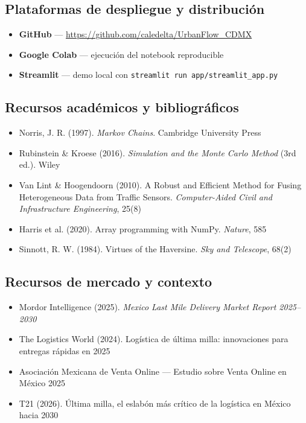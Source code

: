 \documentclass[11pt,a4paper]{article}
\begin{document}
\subsection{Plataformas de despliegue y distribución}
\begin{itemize}
  \item \textbf{GitHub} --- \url{https://github.com/caledelta/UrbanFlow_CDMX}
  \item \textbf{Google Colab} --- ejecución del notebook reproducible
  \item \textbf{Streamlit} --- demo local con \texttt{streamlit run app/streamlit\_app.py}
\end{itemize}

\subsection{Recursos académicos y bibliográficos}
\begin{itemize}
  \item Norris, J. R. (1997). \textit{Markov Chains}. Cambridge University Press
  \item Rubinstein \& Kroese (2016). \textit{Simulation and the Monte Carlo Method} (3rd ed.). Wiley
  \item Van Lint \& Hoogendoorn (2010). A Robust and Efficient Method for Fusing Heterogeneous Data from Traffic Sensors. \textit{Computer-Aided Civil and Infrastructure Engineering}, 25(8)
  \item Harris et al. (2020). Array programming with NumPy. \textit{Nature}, 585
  \item Sinnott, R. W. (1984). Virtues of the Haversine. \textit{Sky and Telescope}, 68(2)
\end{itemize}

\subsection{Recursos de mercado y contexto}
\begin{itemize}
  \item Mordor Intelligence (2025). \textit{Mexico Last Mile Delivery Market Report 2025--2030}
  \item The Logistics World (2024). Logística de última milla: innovaciones para entregas rápidas en 2025
  \item Asociación Mexicana de Venta Online --- Estudio sobre Venta Online en México 2025
  \item T21 (2026). Última milla, el eslabón más crítico de la logística en México hacia 2030
\end{itemize}
\end{document}
